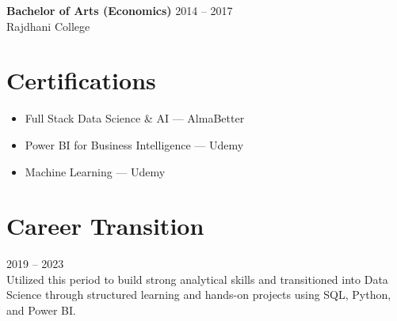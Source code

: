 \documentclass[letterpaper,11pt]{article}
\begin{document}
\textbf{Bachelor of Arts (Economics)} \hfill 2014 -- 2017 \\
Rajdhani College

\section{Certifications}
\begin{itemize}[leftmargin=*]
\item Full Stack Data Science \& AI — AlmaBetter
\item Power BI for Business Intelligence — Udemy
\item Machine Learning — Udemy
\end{itemize}

\section{Career Transition}
2019 -- 2023 \\
Utilized this period to build strong analytical skills and transitioned into Data Science through structured learning and hands-on projects using SQL, Python, and Power BI.
\end{document}
